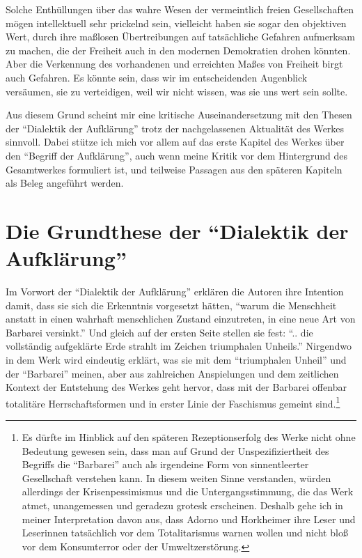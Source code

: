 \documentclass[12pt,a4paper,ngerman]{article}
\begin{document}
Solche Enthüllungen über das wahre Wesen der vermeintlich freien
Gesellschaften mögen intellektuell sehr prickelnd sein, vielleicht haben sie
sogar den objektiven Wert, durch ihre maßlosen Übertreibungen auf tatsächliche
Gefahren aufmerksam zu machen, die der Freiheit auch in den modernen
Demokratien drohen könnten. Aber die Verkennung des vorhandenen und erreichten
Maßes von Freiheit birgt auch Gefahren. Es könnte sein, dass wir im
entscheidenden Augenblick versäumen, sie zu verteidigen, weil wir nicht
wissen, was sie uns wert sein sollte. 
 
Aus diesem Grund scheint mir eine kritische Auseinandersetzung mit den
Thesen der "`Dialektik der Aufklärung"' trotz der nachgelassenen Aktualität
des Werkes sinnvoll. Dabei stütze ich mich vor allem auf das erste Kapitel des
Werkes über den "`Begriff der Aufklärung"', auch wenn meine Kritik vor dem
Hintergrund des Gesamtwerkes formuliert ist, und teilweise Passagen aus den
späteren Kapiteln als Beleg angeführt werden.

\section{Die Grundthese der "`Dialektik der Aufklärung"'}

Im Vorwort der "`Dialektik der Aufklärung"' erklären die Autoren ihre
Intention damit, dass sie sich die Erkenntnis vorgesetzt hätten,
"`warum die Menschheit anstatt in einen wahrhaft menschlichen Zustand
einzutreten, in eine neue Art von Barbarei versinkt."'  \cite[S.
1]{adorno-horkheimer:1947} Und gleich auf der ersten Seite stellen sie
fest: "`.. die vollständig aufgeklärte Erde strahlt im Zeichen
triumphalen Unheils."' \cite[S. 9]{adorno-horkheimer:1947} Nirgendwo
in dem Werk wird eindeutig erklärt, was sie mit dem "`triumphalen
Unheil"' und der "`Barbarei"' meinen, aber aus zahlreichen
Anspielungen und dem zeitlichen Kontext der Entstehung des Werkes geht
hervor, dass mit der Barbarei offenbar totalitäre Herrschaftsformen
und in erster Linie der Faschismus gemeint sind.\footnote{Es dürfte im
  Hinblick auf den späteren Rezeptionserfolg des Werke nicht ohne
  Bedeutung gewesen sein, dass man auf Grund der Unspezifiziertheit
  des Begriffs die "`Barbarei"' auch als irgendeine Form von
  sinnentleerter Gesellschaft verstehen kann. In diesem weiten Sinne
  verstanden, würden allerdings der Krisenpessimismus und die
  Untergangsstimmung, die das Werk atmet, unangemessen und geradezu
  grotesk erscheinen. Deshalb gehe ich in meiner Interpretation davon
  aus, dass Adorno und Horkheimer ihre Leser und Leserinnen
  tatsächlich vor dem Totalitarismus warnen wollen und nicht bloß vor
  dem Konsumterror oder der Umweltzerstörung.}
\end{document}

